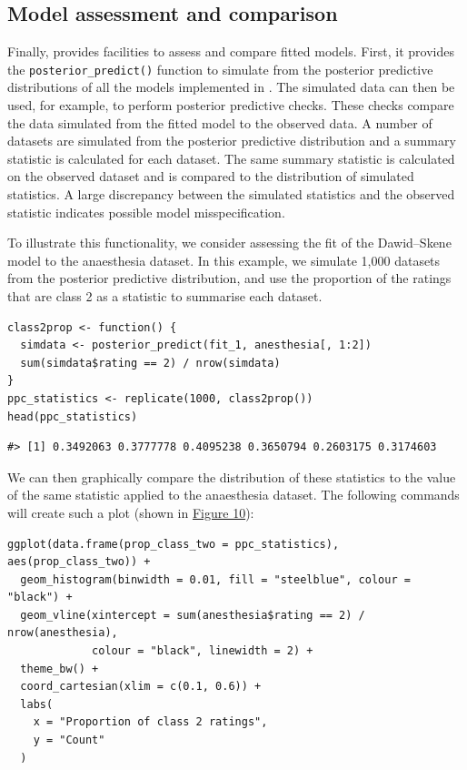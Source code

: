 \hypertarget{sec:model-assessment-comparison}{%
\subsection{Model assessment and comparison}\label{sec:model-assessment-comparison}}

Finally,  provides facilities to assess and compare fitted
models. First, it provides the \texttt{posterior\_predict()} function to simulate from
the posterior predictive distributions of all the models implemented in
. The simulated data can then be used, for example, to perform
posterior predictive checks. These checks compare the data
simulated from the fitted model to the observed data. A number of datasets
are simulated from the posterior predictive distribution and a summary statistic
is calculated for each dataset. The same summary statistic is calculated on the
observed dataset and is compared to the distribution of simulated statistics.
A large discrepancy between the simulated statistics and the observed statistic
indicates possible model misspecification.

To illustrate this functionality, we consider assessing the fit of the
Dawid--Skene model to the anaesthesia dataset. In this example, we simulate
1,000 datasets from the posterior predictive distribution, and use the
proportion of the ratings that are class 2 as a statistic to summarise each
dataset.

\begin{verbatim}
class2prop <- function() {
  simdata <- posterior_predict(fit_1, anesthesia[, 1:2])
  sum(simdata$rating == 2) / nrow(simdata)
}
ppc_statistics <- replicate(1000, class2prop())
head(ppc_statistics)
\end{verbatim}

\begin{verbatim}
#> [1] 0.3492063 0.3777778 0.4095238 0.3650794 0.2603175 0.3174603
\end{verbatim}

We can then graphically compare the distribution of these statistics to the
value of the same statistic applied to the anaesthesia dataset. The following
commands will create such a plot (shown in \protect\hyperlink{fig:plot-ppcs}{Figure 10}):

\begin{verbatim}
ggplot(data.frame(prop_class_two = ppc_statistics), aes(prop_class_two)) +
  geom_histogram(binwidth = 0.01, fill = "steelblue", colour = "black") +
  geom_vline(xintercept = sum(anesthesia$rating == 2) / nrow(anesthesia),
             colour = "black", linewidth = 2) +
  theme_bw() +
  coord_cartesian(xlim = c(0.1, 0.6)) +
  labs(
    x = "Proportion of class 2 ratings",
    y = "Count"
  )
\end{verbatim}

